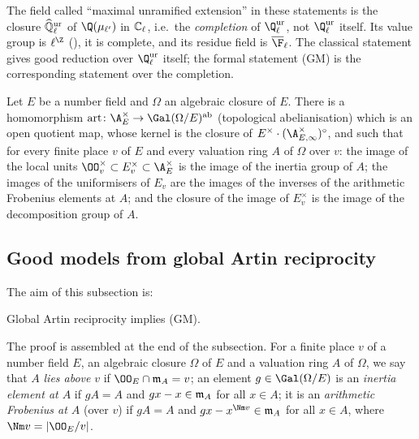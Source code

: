 \begin{remark}\label{pf:reckernel:rem-kur}
The field called ``maximal unramified extension'' in these statements is the closure $\widehat{\mathbb{Q}}{}_\ell^{\mathrm{ur}}$ of
$\Q(\mu_{\ell'})$ in $\mathbb{C}_\ell$, i.e.\ the \emph{completion} of $\Q_\ell^{\mathrm{ur}}$, not $\Q_\ell^{\mathrm{ur}}$
itself. Its value group is $\ell^\Z$ (), it is complete,
and its residue field is $\overline{\F}_\ell$. The classical statement \cite{Deuring1941,SerreTate1968} gives good
reduction over $\Q_\ell^{\mathrm{ur}}$ itself; the formal statement (GM) is the corresponding statement
over the completion.
\end{remark}

\begin{littheorem}\label{pf:reckernel:artinLit}
Let $E$ be a number field and $\Omega$ an algebraic closure of $E$. There is a homomorphism
$\reckart\colon\A_E^\times\to\Gal(\Omega/E)^{\mathrm{ab}}$ (topological abelianisation) which is an open
quotient map, whose kernel is the closure of $E^\times\cdot(\A_{E,\infty}^\times)^\circ$, and such that for every
finite place $v$ of $E$ and every valuation ring $A$ of $\Omega$ over $v$: the image of the local units
$\OO_v^\times\subset E_v^\times\subset\A_E^\times$ is the image of the inertia group of $A$; the images of the
uniformisers of $E_v$ are the images of the inverses of the arithmetic Frobenius elements at $A$; and the closure
of the image of $E_v^\times$ is the image of the decomposition group of $A$.
\end{littheorem}

\subsection{Good models from global Artin reciprocity}\label{pf:reckernel:sec-cm2}

The aim of this subsection is:

\begin{theorem}\label{pf:reckernel:cm2}
Global Artin reciprocity implies \textup{(GM)}.
\end{theorem}

The proof is assembled at the end of the subsection. For a finite place $v$ of a number field $E$, an algebraic
closure $\Omega$ of $E$ and a valuation ring $A$ of $\Omega$, we say that $A$ \emph{lies above} $v$ if
$\OO_E\cap\reckm_A=v$; an element $g\in\Gal(\Omega/E)$ is an \emph{inertia element at $A$} if $gA=A$ and
$gx-x\in\mathfrak{m}_A$ for all $x\in A$; it is an \emph{arithmetic Frobenius at $A$} (over $v$) if $gA=A$ and
$gx-x^{\Nm v}\in\reckm_A$ for all $x\in A$, where $\Nm v=|\OO_E/v|$.

